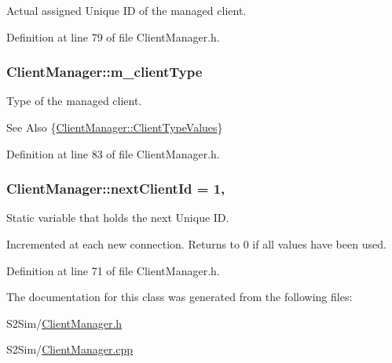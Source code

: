 Actual assigned Unique I\-D of the managed client. 



Definition at line 79 of file Client\-Manager.\-h.

\hypertarget{class_client_manager_af40c31ade3f23b705bce2a8b3d311ce6}{
\subsubsection[{m\-\_\-client\-Type}]{ Client\-Manager\-::m\-\_\-client\-Type\hspace{0.3cm}{\ttfamily [private]}}}\label{class_client_manager_af40c31ade3f23b705bce2a8b3d311ce6}


Type of the managed client. 

\begin{DoxySeeAlso}{See Also}
\{\hyperlink{class_client_manager_ac12239be9a30847f677a32910822d40b}{Client\-Manager\-::\-Client\-Type\-Values}\} 
\end{DoxySeeAlso}


Definition at line 83 of file Client\-Manager.\-h.

\hypertarget{class_client_manager_a4f044df4d9f43367135f9d01841ec326}{
\subsubsection[{next\-Client\-Id}]{ Client\-Manager\-::next\-Client\-Id = 1\hspace{0.3cm}{\ttfamily [static]}, {\ttfamily [private]}}}\label{class_client_manager_a4f044df4d9f43367135f9d01841ec326}


Static variable that holds the next Unique I\-D. 

Incremented at each new connection. Returns to 0 if all values have been used. 

Definition at line 71 of file Client\-Manager.\-h.



The documentation for this class was generated from the following files\-:\begin{DoxyCompactItemize}
\item 
S2\-Sim/\hyperlink{_client_manager_8h}{Client\-Manager.\-h}\item 
S2\-Sim/\hyperlink{_client_manager_8cpp}{Client\-Manager.\-cpp}\end{DoxyCompactItemize}
